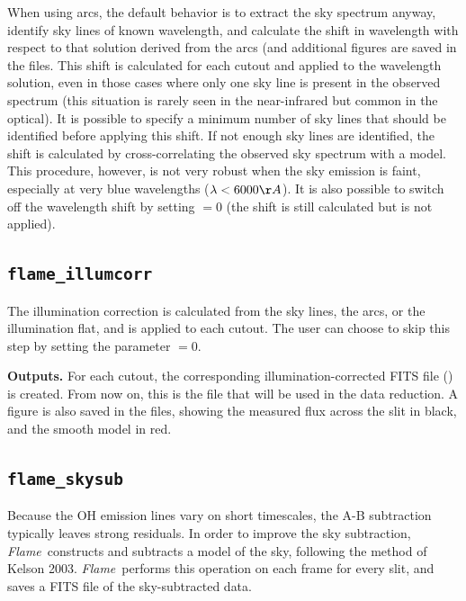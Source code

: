 \documentclass[a4paper]{article}
\newcommand{\flame}{\emph{Flame}}
\begin{document}
\begin{sloppypar}
When using arcs, the default behavior is to extract the sky spectrum anyway, identify sky lines of known wavelength, and calculate the shift in wavelength with respect to that solution derived from the arcs (and additional figures are saved in the  files. This shift is calculated for each cutout and applied to the wavelength solution, even in those cases where only one sky line is present in the observed spectrum (this situation is rarely seen in the near-infrared but common in the optical). It is possible to specify a minimum number of sky lines that should be identified before applying this shift. If not enough sky lines are identified, the shift is calculated by cross-correlating the observed sky spectrum with a model. This procedure, however, is not very robust when the sky emission is faint, especially at very blue wavelengths ($\lambda < 6000\AA$). It is also possible to switch off the wavelength shift by setting $=0$ (the shift is still calculated but is not applied).


\subsection{\texttt{flame\_illumcorr}}
\label{sec:illumcorr}

The illumination correction is calculated from the sky lines, the arcs, or the illumination flat, and is applied to each cutout. The user can choose to skip this step by setting the parameter $=0$.

\medskip
\noindent
\textbf{Outputs.} For each cutout, the corresponding illumination-corrected FITS file () is created. From now on, this is the file that will be used in the data reduction. A figure is also saved in the  files, showing the measured flux across the slit in black, and the smooth model in red.



\subsection{\texttt{flame\_skysub}}
\label{sec:skysub}

Because the OH emission lines vary on short timescales, the A-B subtraction typically leaves strong residuals. In order to improve the sky subtraction, \flame\ constructs and subtracts a model of the sky, following the method of Kelson 2003. \flame\ performs this operation on each frame for every slit, and saves a FITS file of the sky-subtracted data.


\end{sloppypar}
\end{document}
